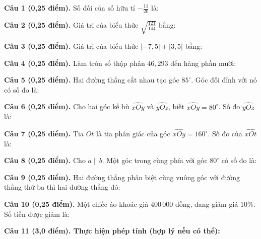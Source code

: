 \documentclass[12pt,a4paper]{article}
\begin{document}
\noindent\textbf{Câu 1 (0,25 điểm).} Số đối của số hữu tỉ $-\frac{11}{20}$ là: \par\vspace{2.4mm}
\noindent\textbf{Câu 2 (0,25 điểm).} Giá trị của biểu thức $\sqrt{\frac{121}{144}}$ bằng: \par\vspace{2.4mm}
\noindent\textbf{Câu 3 (0,25 điểm).} Giá trị của biểu thức $|-7{,}5| + |3{,}5|$ bằng: \par\vspace{2.4mm}
\noindent\textbf{Câu 4 (0,25 điểm).} Làm tròn số thập phân $46{,}293$ đến hàng phần mười: \par\vspace{2.4mm}
\noindent\textbf{Câu 5 (0,25 điểm).} Hai đường thẳng cắt nhau tạo góc $85^\circ$. Góc đối đỉnh với nó có số đo là: \par\vspace{2.4mm}
\noindent\textbf{Câu 6 (0,25 điểm).} Cho hai góc kề bù $\widehat{xOy}$ và $\widehat{yOz}$, biết $\widehat{xOy} = 80^\circ$. Số đo $\widehat{yOz}$ là: \par\vspace{2.4mm}
\noindent\textbf{Câu 7 (0,25 điểm).} Tia $Ot$ là tia phân giác của góc $\widehat{xOy} = 160^\circ$. Số đo của $\widehat{xOt}$ là: \par\vspace{2.4mm}
\noindent\textbf{Câu 8 (0,25 điểm).} Cho $a \parallel b$. Một góc trong cùng phía với góc $80^\circ$ có số đo là: \par\vspace{2.4mm}
\noindent\textbf{Câu 9 (0,25 điểm).} Hai đường thẳng phân biệt cùng vuông góc với đường thẳng thứ ba thì hai đường thẳng đó: \par\vspace{2.4mm}
\noindent\textbf{Câu 10 (0,25 điểm).} Một chiếc áo khoác giá $400\,000$ đồng, đang giảm giá $10\%$. Số tiền được giảm là: \par\vspace{2.4mm}
\vspace{0.4mm}

\noindent\textbf{Câu 11 (3,0 điểm). Thực hiện phép tính (hợp lý nếu có thể):}
\vspace{0.8mm}
\end{document}
